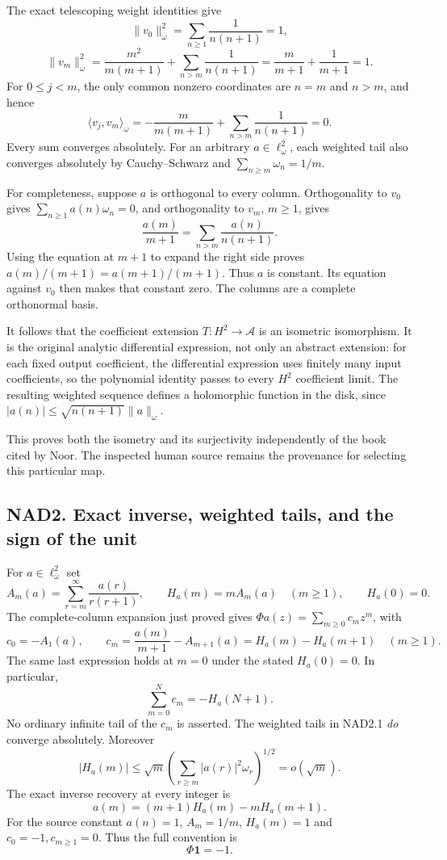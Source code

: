 The exact telescoping weight identities give \[
 \|v_0\|_\omega^2=\sum_{n\ge1}\frac1{n(n+1)}=1,
\] \[
 \|v_m\|_\omega^2=\frac{m^2}{m(m+1)}+
       \sum_{n>m}\frac1{n(n+1)}=\frac m{m+1}+\frac1{m+1}=1.
\] For \(0\le j<m\), the only common nonzero coordinates are \(n=m\) and
\(n>m\), and hence \[
 \langle v_j,v_m\rangle_\omega
 =-\frac m{m(m+1)}+\sum_{n>m}\frac1{n(n+1)}=0.
 \tag{NAD1.2}
\] Every sum converges absolutely. For an arbitrary
\(a\in\ell^2_\omega\), each weighted tail also converges absolutely by
Cauchy--Schwarz and \(\sum_{n\ge m}\omega_n=1/m\).

For completeness, suppose \(a\) is orthogonal to every column.
Orthogonality to \(v_0\) gives \(\sum_{n\ge1}a(n)\omega_n=0\), and
orthogonality to \(v_m\), \(m\ge1\), gives \[
 \frac{a(m)}{m+1}=\sum_{n>m}\frac{a(n)}{n(n+1)}.
\] Using the equation at \(m+1\) to expand the right side proves
\(a(m)/(m+1)=a(m+1)/(m+1)\). Thus \(a\) is constant. Its equation
against \(v_0\) then makes that constant zero. The columns are a
complete orthonormal basis.

It follows that the coefficient extension \(T:H^2\to\mathcal A\) is an
isometric isomorphism. It is the original analytic differential
expression, not only an abstract extension: for each fixed output
coefficient, the differential expression uses finitely many input
coefficients, so the polynomial identity passes to every \(H^2\)
coefficient limit. The resulting weighted sequence defines a holomorphic
function in the disk, since \(|a(n)|\le\sqrt{n(n+1)}\|a\|_\omega\).

This proves both the isometry and its surjectivity independently of the
book cited by Noor. The inspected human source remains the provenance
for selecting this particular map.

\subsection{NAD2. Exact inverse, weighted tails, and the sign of the
unit}\label{nad2.-exact-inverse-weighted-tails-and-the-sign-of-the-unit}

For \(a\in\ell^2_\omega\) set \[
 A_m(a)=\sum_{r=m}^{\infty}\frac{a(r)}{r(r+1)},\qquad
 H_a(m)=m A_m(a)\quad(m\ge1),\qquad H_a(0)=0.
 \tag{NAD2.1}
\] The complete-column expansion just proved gives
\(\Phi a(z)=\sum_{m\ge0}c_mz^m\), with \[
 c_0=-A_1(a),\qquad
 c_m=\frac{a(m)}{m+1}-A_{m+1}(a)
     =H_a(m)-H_a(m+1)\quad(m\ge1).
 \tag{NAD2.2}
\] The same last expression holds at \(m=0\) under the stated
\(H_a(0)=0\). In particular, \[
 \boxed{\sum_{m=0}^{N}c_m=-H_a(N+1).}
 \tag{NAD2.3}
\] No ordinary infinite tail of the \(c_m\) is asserted. The weighted
tails in NAD2.1 \emph{do} converge absolutely. Moreover \[
 |H_a(m)|\le\sqrt m\left(\sum_{r\ge m}|a(r)|^2\omega_r\right)^{1/2}
 =o(\sqrt m).
 \tag{NAD2.4}
\] The exact inverse recovery at every integer is \[
 a(m)=(m+1)H_a(m)-mH_a(m+1).
 \tag{NAD2.5}
\] For the source constant \(a(n)=1\), \(A_m=1/m\), \(H_a(m)=1\) and
\(c_0=-1,c_{m\ge1}=0\). Thus the full convention is \[
 \boxed{\Phi\boldsymbol1=-1.}
 \tag{NAD2.6}
\]

